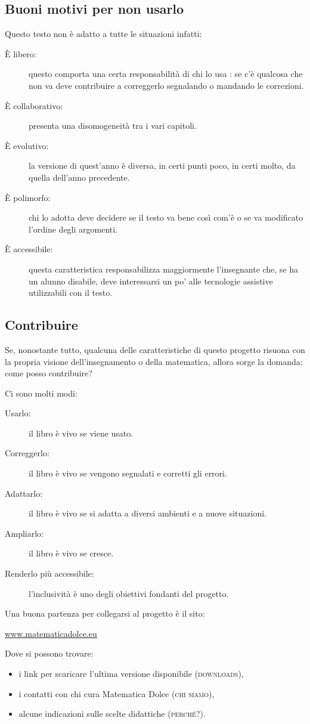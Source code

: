 \documentclass[a4paper,10pt]{article}
\begin{document}
\subsection{Buoni motivi per non usarlo}

Questo testo non è adatto a tutte le situazioni infatti:
\begin{description}
\item [È libero: ] questo comporta una certa responsabilità di chi lo usa :
se c'è qualcosa che non va deve contribuire a correggerlo segnalando o 
mandando le correzioni.
\item [È collaborativo: ] presenta una disomogeneità tra i vari capitoli.
\item [È evolutivo: ] la versione di quest'anno è diversa, in certi punti 
poco, in certi molto, da quella dell'anno precedente.
\item [È polimorfo: ] chi lo adotta deve decidere se il testo va bene così 
com'è o se va modificato l'ordine degli argomenti.
\item [È accessibile: ] questa caratteristica responsabilizza maggiormente 
l'insegnante che, se ha un alunno disabile, deve interessarsi un po' alle 
tecnologie assistive utilizzabili con il testo.
\end{description}

\subsection{Contribuire}

Se, nonostante tutto, qualcuna delle caratteristiche di questo progetto 
risuona con la propria visione dell'insegnamento o della matematica, allora 
sorge la domanda: come posso contribuire?

Ci sono molti modi:
\begin{description}
\item [Usarlo: ] il libro è vivo se viene usato.
\item [Correggerlo: ] il libro è vivo se vengono segnalati e corretti gli 
errori.
\item [Adattarlo: ] il libro è vivo se si adatta a diversi ambienti e a 
nuove situazioni.
\item [Ampliarlo: ] il libro è vivo se cresce.
\item [Renderlo più accessibile: ] l'inclusività è uno degli obiettivi 
fondanti del progetto.
\end{description}

Una buona partenza per collegarsi al progetto è il sito:
\begin{center}
\href{https://www.matematicadolce.eu}{www.matematicadolce.eu}
\end{center}

Dove si possono trovare:
\begin{itemize}
\item i link per scaricare l'ultima versione disponibile 
(\textsc{downloads}),
\item i contatti con chi cura Matematica Dolce
(\textsc{chi siamo}),
\item alcune indicazioni sulle scelte didattiche
(\textsc{perché?}).
\end{itemize}
\end{document}
